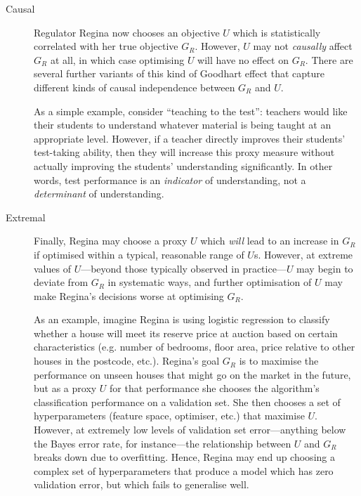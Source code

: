 \documentclass[11pt]{article}
\begin{document}
\begin{description}
  \item[Causal]
    Regulator Regina now chooses an objective $U$ which is statistically
    correlated with her true objective $G_R$.
    However, $U$ may not \textit{causally} affect $G_R$ at all, in which case
    optimising $U$ will have no effect on $G_R$.
    There are several further variants of this kind of Goodhart effect that
    capture different kinds of causal independence between $G_R$ and $U$.

    As a simple example, consider ``teaching to the test'': teachers would like
    their students to understand whatever material is being taught at an
    appropriate level.
    However, if a teacher directly improves their students' test-taking ability,
    then they will increase this proxy measure without actually improving the
    students' understanding significantly.
    In other words, test performance is an \textit{indicator} of understanding,
    not a \textit{determinant} of understanding.

  \item[Extremal]
    Finally, Regina may choose a proxy $U$ which \textit{will} lead to an
    increase in $G_R$ if optimised within a typical, reasonable range of $U$s.
    However, at extreme values of $U$---beyond those typically observed in
    practice---$U$ may begin to deviate from $G_R$ in systematic ways, and
    further optimisation of $U$ may make Regina's decisions worse at optimising
    $G_R$.

    As an example, imagine Regina is using logistic regression to classify
    whether a house will meet its reserve price at auction based on certain
    characteristics (e.g. number of bedrooms, floor area, price relative to
    other houses in the postcode, etc.).
    Regina's goal $G_R$ is to maximise the performance on unseen houses that
    might go on the market in the future, but as a proxy $U$ for that
    performance she chooses the algorithm's classification performance on a
    validation set.
    She then chooses a set of hyperparameters (feature space, optimiser, etc.)
    that maximise $U$.
    However, at extremely low levels of validation set error---anything below the
    Bayes error rate, for instance---the relationship between $U$ and $G_R$
    breaks down due to overfitting.
    Hence, Regina may end up choosing a complex set of hyperparameters that
    produce a model which has zero validation error, but which fails to
    generalise well.
\end{description}
\end{document}
